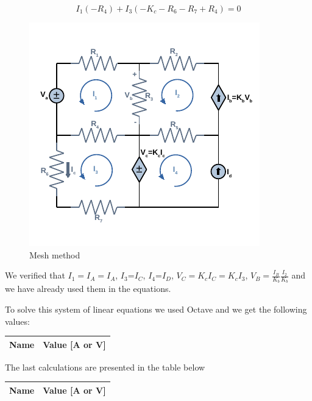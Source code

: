 \begin{center}
    \begin{equation}
        I_1(-R_4)+I_3(-K_c-R_6-R_7+R_4)=0 
    \end{equation}
\end{center}


\begin{figure}[h] \centering
\includegraphics[width=0.8\linewidth]{mesh.pdf}
\caption{Mesh method}
\label{fig:forced}
\end{figure}


We verified that $I_1=I_A=I_A$, $I_3$=$I_C$, $I_4$=$I_D$, $V_C=K_cI_C=K_cI_3$, $V_B=\frac{I_B}{K_b}\frac{I_2}{K_b} $ and we have already used them in the equations. 

To solve this system of linear equations we used Octave and we get the following values:

\begin{table}
  \centering
  \begin{tabular}{|l|r|}
    \hline    
    {\bf Name} & {\bf Value [A or V]} \\ \hline
    
  \end{tabular}
  \label{tab:op}
\end{table}

The last calculations are presented in the table below 

\begin{table}[h]
  \centering
  \begin{tabular}{|l|r|}
    \hline    
    {\bf Name} & {\bf Value [A or V]} \\ \hline
    
  \end{tabular}
  \label{tab:op}
\end{table}

